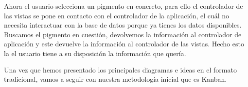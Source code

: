 Ahora el usuario selecciona un pigmento en concreto, para ello el controlador de las vistas se pone en contacto con el controlador de la aplicación, el cuál no necesita interactuar con la base de datos porque ya tienes los datos disponibles. Buscamos el pigmento en cuestión, devolvemos la información al controlador de aplicación y este devuelve la información al controlador de las vistas. Hecho esto la el usuario tiene a su disposición la información que quería. 

Una vez que hemos presentado los principales diagramas e ideas en el formato tradicional, vamos a seguir con nuestra metodología inicial que es Kanban. 

